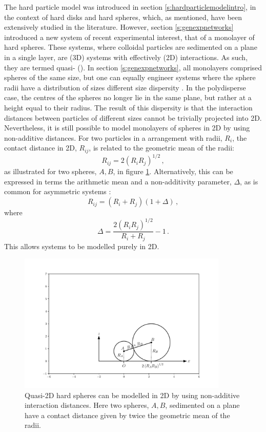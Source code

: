 The hard particle model was introduced in section  \ref{s:hardparticlemodelintro}, in the context of hard disks and hard spheres, which, as mentioned, have been extensively studied in the literature.
However, section \ref{s:genexpnetworks} introduced a new system of recent experimental interest, that of a monolayer of hard spheres.
These systems, where colloidal particles are sedimented on a plane in a single layer, are \thd{} (3D) systems with effectively \td{} (2D) interactions.
As such, they are termed quasi\--\td{} (\qtd{}).
In section \ref{s:genexpnetworks}, all monolayers comprised spheres of the same size, but one can equally engineer systems where the sphere radii have a distribution of sizes \ie{} different size dispersity \cite{Thorneywork2014,Thorneywork2018}.
In the polydisperse case, the centres of the spheres no longer lie in the same plane, but rather at a height equal to their radius.
The result of this dispersity is that the interaction distances between particles of different sizes cannot be trivially projected into 2D.
Nevertheless, it is still possible to model monolayers of spheres in 2D by using non\--additive distances.
For two particles in a \qtd{} arrangement with radii, $R_i$, the contact distance in 2D, $R_{ij}$, is related to the geometric mean of the radii:
\begin{equation}
	R_{ij}=2\left(R_iR_j\right)^{1/2}\,,
\end{equation}
as  illustrated for two spheres, $A,B$, in figure \ref{fig:nonadddemo}.
Alternatively, this can be expressed in terms the arithmetic mean and a non\--additivity parameter, $\Delta$, as is common for asymmetric systems \cite{Roth2001}:
\begin{equation}
	R_{ij}=\left(R_i+R_j\right)\left(1+\Delta\right)\,,
\end{equation}
where
\begin{equation}
	\Delta=\frac{2\left(R_iR_j\right)^{1/2}}{R_i+R_j}-1\,.
\end{equation}
This allows \qtd{} systems to be modelled purely in 2D.

\begin{figure}[bth]
     \centering
     
     \includegraphics[width=10cm]{./figures/quasi2d/quasi2d_a.pdf}
     \caption{Quasi\--2D hard spheres can be modelled in 2D by using non\--additive interaction distances. Here two spheres, $A,B$, sedimented on a plane have a contact distance given by twice the geometric mean of the radii.}
     \label{fig:nonadddemo}
\end{figure}

